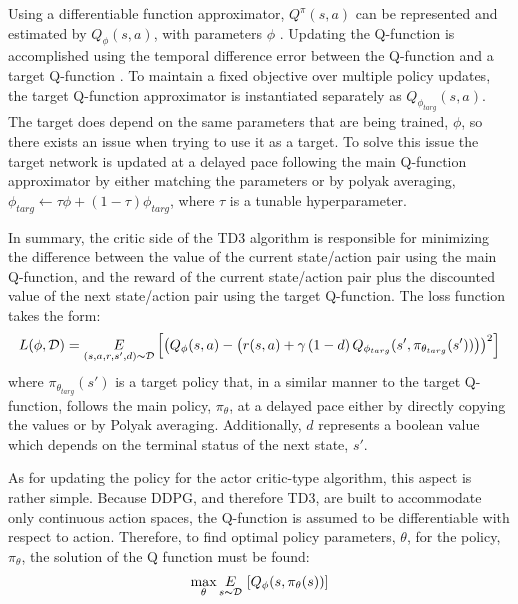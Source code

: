 Using a differentiable function approximator, $Q^{\pi}(s,a)$ can be represented and estimated by $Q_{\phi}(s,a)$, with parameters $\phi$ \cite{Mnihg}. Updating the Q-function is accomplished using the temporal difference error between the Q-function and a target Q-function \cite{Sutton1991, Watkins1989}. To maintain a fixed objective over multiple policy updates, the target Q-function approximator is instantiated separately as $Q_{\phi_{targ}}(s,a)$. The target does depend on the same parameters that are being trained, $\phi$, so there exists an issue when trying to use it as a target. To solve this issue the target network is updated at a delayed pace following the main Q-function approximator by either matching the parameters or by polyak averaging, $\phi_{targ} \leftarrow \tau \phi + (1-\tau)\phi_{targ}$, where $\tau$ is a tunable hyperparameter. 

In summary, the critic side of the TD3 algorithm is responsible for minimizing the difference between the value of the current state/action pair using the main Q-function, and the reward of the current state/action pair plus the discounted value of the next state/action pair using the target Q-function. The loss function takes the form:
% 
\begin{equation}
  \label{eq:q_func_loss}
  \begin{aligned}
    L(\phi, \mathcal{D}) = \underset{(s,a,r,s',d) \thicksim \mathcal{D}}{E} \left[ \left( Q_{\phi}(s,a) - \left( r(s,a) + \gamma \, (1-d) \, Q_{\phi_{targ}}(s', \pi_{\theta_{targ}}(s')) \right)  \right)^2 \right]
  \end{aligned}
\end{equation}
% 
where $\pi_{\theta_{targ}}(s')$ is a target policy that, in a similar manner to the target Q-function, follows the main policy, $\pi_{\theta}$, at a delayed pace either by directly copying the values or by Polyak averaging. Additionally, $d$ represents a boolean value which depends on the terminal status of the next state, $s'$. 

As for updating the policy for the actor critic-type algorithm, this aspect is rather simple. Because DDPG, and therefore TD3, are built to accommodate only continuous action spaces, the Q-function is assumed to be differentiable with respect to action. Therefore, to find optimal policy parameters, $\theta$, for the policy, $\pi_{\theta}$, the solution of the Q function must be found:
% 
\begin{equation}
  \label{eq:policy_update}
  \begin{aligned}
    \underset{\theta}{\textup{max}} \, \underset{s \thicksim \mathcal{D}}{E} \, \left[Q_{\phi}(s, \pi_{\theta}(s))\right]
  \end{aligned}
\end{equation}

